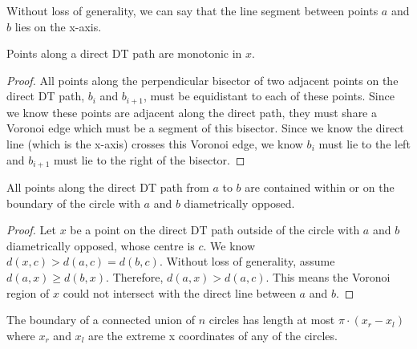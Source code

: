 \documentclass{tufte-handout}
\begin{document}
Without loss of generality, we can say that the line segment between
points $a$ and $b$ lies on the x-axis.

\newpage

\begin{Lemma}

  \label{lemma:monotonic:path}

  Points along a direct DT path are monotonic in $x$.

\end{Lemma}

\begin{proof}

  All points along the perpendicular bisector of two adjacent points
  on the direct DT path, $b_i$ and $b_{i+1}$, must be equidistant to
  each of these points.  Since we know these points are adjacent along
  the direct path, they must share a Voronoi edge which must be a
  segment of this bisector.  Since we know the direct line (which is
  the x-axis) crosses this Voronoi edge, we know $b_i$ must lie to the
  left and $b_{i+1}$ must lie to the right of the bisector.
  
\end{proof}

\begin{Lemma}

  \label{lemma:circle:contains:path}

  All points along the direct DT path from $a$ to $b$ are contained
  within or on the boundary of the circle with $a$ and $b$
  diametrically opposed.  \footnotemark
  
\end{Lemma}

  
\begin{proof}
  
  Let $x$ be a point on the direct DT path outside of the circle
  with $a$ and $b$ diametrically opposed, whose centre is $c$.  We
  know $d(x,c) > d(a,c) = d(b,c)$.  Without loss of generality,
  assume $d(a,x) \ge d(b,x)$.  Therefore, $d(a,x) > d(a,c)$.  This
  means the Voronoi region of $x$ could not intersect with the
  direct line between $a$ and $b$.
  
\end{proof}

\newpage

\begin{Lemma}

  \label{lemma:boundary:circles}

  The boundary of a connected union of $n$ circles has length at most
  $\pi \cdot ( x_r - x_l )$ where $x_r$ and $x_l$ are the extreme x
  coordinates of any of the circles.
  
\end{Lemma}
\end{document}

